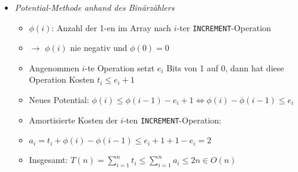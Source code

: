 \begin{itemize}
\begin{itemize}
                \item \textit{Potential-Methode anhand des Binärzählers}
                    \begin{itemize}
                        \item $\phi(i)$: Anzahl der 1-en im Array nach $i$-ter \texttt{INCREMENT}-Operation
                        \item[] $\rightarrow$ $\phi(i)$ nie negativ und $\phi(0) = 0$
                        \item Angenommen $i$-te Operation setzt $e_i$ Bits von 1 auf 0, dann hat diese Operation Kosten $t_i \leq e_i + 1$
                        \item Neues Potential: $\phi(i) \leq \phi(i-1) - e_i + 1 \Leftrightarrow \phi(i) - \phi(i-1) \leq e_i$
                        \item Amortisierte Kosten der $i$-ten \texttt{INCREMENT}-Operation:
                        \item[] $a_i = t_i + \phi(i) - \phi(i-1) \leq e_i + 1 + 1 - e_i = 2$
                        \item Insgesamt: $T(n) = \sum^n_{i=1} t_i \leq \sum^n_{i=1} a_i \leq 2n \in O(n)$ 
                    \end{itemize}
            \end{itemize}
    \end{itemize}
